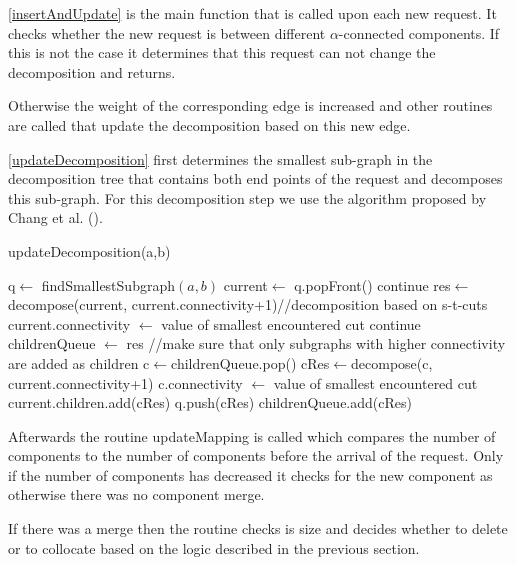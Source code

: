 \documentclass[a4paper,xcolor=dvipsnames, tikz, 12pt]{article}
\theoremstyle{definition}
\begin{document}
\cref{insertAndUpdate} is the main function that is called upon each new request. It checks whether the new request is between different $\alpha$-connected components. If this is not the case it determines that this request can not change the decomposition and returns.

Otherwise the weight of the corresponding edge is increased and other routines are called that update the decomposition based on this new edge.

\cref{updateDecomposition} first determines the smallest sub-graph in the decomposition tree that contains both end points of the request and decomposes this sub-graph. For this decomposition step we use the algorithm proposed by Chang et al. (\cite{Chang2013}). %

\begin{algorithm}
	\caption{updateDecomposition(a,b)}
	\label{updateDecomposition}
	\begin{algorithmic}
		\STATE q$\leftarrow$ findSmallestSubgraph$(a,b)$
		\STATE current$\leftarrow$ q.popFront()
		\STATE continue
		\ENDIF
		\STATE res$\leftarrow$ decompose(current, current.connectivity+1)//decomposition based on s-t-cuts
		\STATE current.connectivity $\leftarrow$ value of smallest encountered cut
		\STATE continue
		\ENDIF
		\STATE childrenQueue $\leftarrow$ res
		\STATE //make sure that only subgraphs with higher connectivity are added as children
		\STATE c$\leftarrow$childrenQueue.pop()
		\STATE cRes$\leftarrow$decompose(c, current.connectivity+1)
		\STATE c.connectivity $\leftarrow$ value of smallest encountered cut
		\STATE current.children.add(cRes)
		\STATE q.push(cRes)
		\ENDIF
		\ELSE
		\STATE childrenQueue.add(cRes)
		\ENDIF
		\ENDWHILE
		\ENDWHILE
	\end{algorithmic}		
\end{algorithm}

Afterwards the routine updateMapping is called which compares the number of components to the number of components before the arrival of the request. Only if the number of components has decreased it checks for the new component as otherwise there was no component merge. 

If there was a merge then the routine checks is size and decides whether to delete or to collocate based on the logic described in the previous section.
\end{document}
